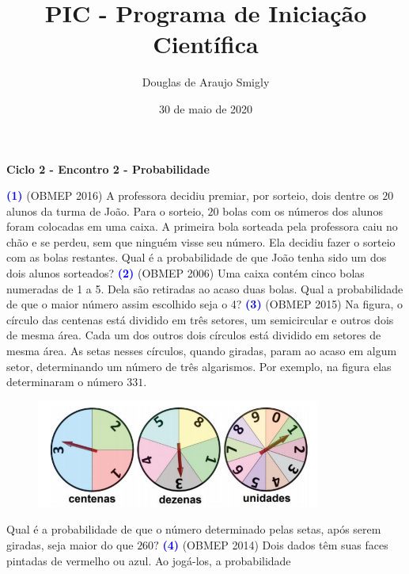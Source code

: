 \documentclass[12pt, a4paper]{article}
\title{PIC - Programa de Iniciação Científica}
\author{Douglas de Araujo Smigly}
\date{30 de maio de 2020}
\begin{document}
\maketitle
\begin{center}
\large\textbf{\textcolor{Floresta}{Ciclo 2 - Encontro 2 - Probabilidade}}\\
\end{center}
\textcolor{blue}{\bf(1)} (OBMEP 2016) A professora decidiu premiar, por sorteio, dois dentre os $20$ alunos da turma de João. Para o sorteio, $20$ bolas com os números dos alunos foram colocadas em uma caixa. A primeira bola sorteada pela professora caiu no chão e se perdeu, sem que ninguém visse seu número. Ela decidiu fazer o sorteio com as bolas restantes. Qual é a
probabilidade de que João tenha sido um dos dois alunos sorteados?
\newline\newline
\textcolor{blue}{\bf(2)} (OBMEP 2006) Uma caixa contém cinco bolas numeradas de 1 a 5. Dela são retiradas ao acaso duas
bolas. Qual a probabilidade de que o maior número assim escolhido seja o 4? \newline\newline
\textcolor{blue}{\bf(3)} (OBMEP 2015) Na figura, o círculo das centenas está dividido em três setores, um semicircular e
outros dois de mesma área. Cada um dos outros dois círculos está dividido em setores de mesma área. As setas nesses círculos, quando giradas, param ao acaso em algum setor, determinando um número de três algarismos. Por exemplo, na figura elas determinaram o número $331.$
\begin{figure}[!h]
    \centering
    \includegraphics{Figuras/q3c2e2.png}
\end{figure}
Qual é a probabilidade de que o número determinado pelas setas, após serem giradas, seja maior do que $260?$
\newline\newline
\textcolor{blue}{\bf(4)} (OBMEP 2014) Dois dados têm suas faces pintadas de vermelho ou azul. Ao jogá-los, a probabilidade
\end{document}
